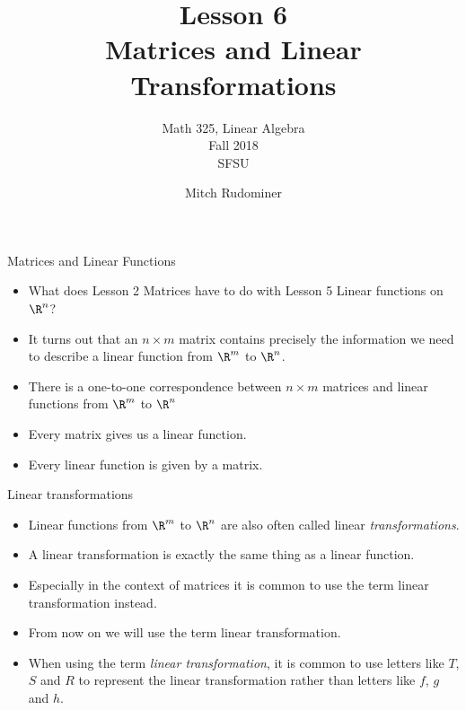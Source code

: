 \documentclass{beamer}
\title{Lesson 6 \\ Matrices and Linear Transformations}
\subtitle{Math 325, Linear Algebra \\ Fall 2018 \\ SFSU}
\author{Mitch Rudominer}
\date{}
\begin{document}
\begin{frame}
  \titlepage
\end{frame}



\begin{frame}{Matrices and Linear Functions}

\begin{itemize}
\item What does Lesson 2 Matrices have to do with Lesson 5 Linear functions on $\R^n$?
\item It turns out that an $n\times m$ matrix contains precisely the information we need
to describe a linear function from $\R^m$ to $\R^n$.
\item There is a one-to-one correspondence between $n\times m$ matrices and linear
functions from $\R^m$ to $\R^n$
\item Every matrix gives us a linear function.
\item Every linear function is given by a matrix.
\end{itemize}

\end{frame}


\begin{frame}{Linear transformations}

\begin{itemize}
\item Linear functions from $\R^m$ to $\R^n$ are also often called
linear \emph{transformations}.
\item A linear transformation is exactly the same thing as a linear function.
\item Especially in the context of matrices it is common to use the term
linear transformation instead.
\item From now on we will use the term linear transformation.
\item When using the term \emph{linear transformation}, it is common to use
letters like $T$, $S$ and $R$ to represent the linear transformation rather
than letters like $f$, $g$ and $h$.
\end{itemize}

\end{frame}

\end{document}
